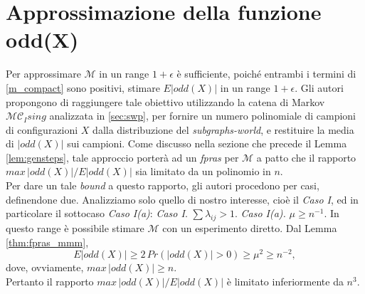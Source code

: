 \section{Approssimazione della funzione odd(X)}\label{sec:oddx}
Per approssimare $\mathcal{M}$ in un range $1 + \epsilon$ è sufficiente, poiché entrambi i termini di \ref{m_compact} sono positivi, stimare $E|odd(X)|$ in un range $1 + \epsilon$. Gli autori propongono di raggiungere tale obiettivo utilizzando la catena di Markov $\mathcal{MC}_Ising$ analizzata in \ref{sec:swp}, per fornire un numero polinomiale di campioni di configurazioni $X$ dalla distribuzione del \textit{subgraphs-world}, e restituire la media di $|odd(X)|$ sui campioni. Come discusso nella sezione che precede il Lemma \ref{lem:gensteps}, tale approccio porterà ad un \textit{fpras} per $\mathcal{M}$ a patto che il rapporto $max\,|odd(X)|/E|odd(X)|$ sia limitato da un polinomio in $n$.\\
Per dare un tale \textit{bound} a questo rapporto, gli autori procedono per casi, definendone due. Analizziamo solo quello di nostro interesse, cioè il \textit{Caso I}, ed in particolare il sottocaso \textit{Caso I(a)}:
\textit{Caso I}. $\sum{\lambda_{ij}} > 1$.
\textit{Caso I(a).} $\mu \geq n^{-1}$. In questo range è possibile stimare $\mathcal{M}$ con un esperimento diretto. Dal Lemma \ref{thm:fpras_mmm},
\begin{equation}
	E|odd(X)| \geq 2\, Pr(|odd(X)| > 0) \geq \mu^2 \geq n^{-2},
	\label{eoddx_bound}
\end{equation}
dove, ovviamente, $max\,|odd(X)| \geq n$.\\
Pertanto il rapporto $max\,|odd(X)|/E|odd(X)|$ è limitato inferiormente da $n^3$.
